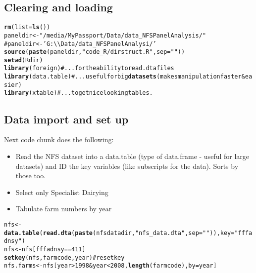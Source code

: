 \documentclass{article}\usepackage{graphicx, color}
\makeatletter
\newcommand{\hlfunctioncall}[1]{\textcolor[rgb]{0.501960784313725,0,0.329411764705882}{\textbf{#1}}}%
\newcommand{\hlstring}[1]{\textcolor[rgb]{0.6,0.6,1}{#1}}%
\newcommand{\hlcomment}[1]{\textcolor[rgb]{0.180392156862745,0.6,0.341176470588235}{#1}}%
\newenvironment{kframe}{%
 \def\at@end@of@kframe{}%
 \ifinner\ifhmode%
  \def\at@end@of@kframe{\end{minipage}}%
  \begin{minipage}{\columnwidth}%
 \fi\fi%
 \def\FrameCommand##1{\hskip\@totalleftmargin \hskip-\fboxsep
 \colorbox{shadecolor}{##1}\hskip-\fboxsep
     \hskip-\linewidth \hskip-\@totalleftmargin \hskip\columnwidth}%
 \MakeFramed {\advance\hsize-\width
   \@totalleftmargin\z@ \linewidth\hsize
   \@setminipage}}%
 {\par\unskip\endMakeFramed%
 \at@end@of@kframe}
\newenvironment{knitrout}{}{} %
\makeatother
\begin{document}
\begin{flushleft}
\subsection*{Clearing and loading}
\begin{knitrout}
\color{fgcolor}\begin{kframe}
\begin{alltt}
\hlfunctioncall{rm}(list = \hlfunctioncall{ls}())
paneldir <- \hlstring{"/media/MyPassport/Data/data_NFSPanelAnalysis/"}
\hlcomment{# paneldir <- 'G:\textbackslash{}\textbackslash{}Data/data_NFSPanelAnalysi/'}
\hlfunctioncall{source}(\hlfunctioncall{paste}(paneldir, \hlstring{"code_R/dirstruct.R"}, sep = \hlstring{""}))
\hlfunctioncall{setwd}(Rdir)
\hlfunctioncall{library}(foreign)  \hlcomment{#...for the ability to read .dta files}
\hlfunctioncall{library}(data.table)  \hlcomment{#... useful for big \hlfunctioncall{datasets} (makes manipulation faster & easier)}
\hlfunctioncall{library}(xtable)  \hlcomment{#... to get nice looking tables.}
\end{alltt}
\end{kframe}
\end{knitrout}

 
\subsection*{Data import and set up}

Next code chunk does the following:
\begin{itemize}
  \item {Read the NFS dataset into a data.table (type of data.frame - useful for large datasets) and ID the key
        variables (like subscripts for the data). Sorts by those too.}
  \item {Select only Specialist Dairying}
  \item {Tabulate farm numbers by year}
\end{itemize}
\begin{knitrout}
\color{fgcolor}\begin{kframe}
\begin{alltt}
nfs <- \hlfunctioncall{data.table}(\hlfunctioncall{read.dta}(\hlfunctioncall{paste}(nfsdatadir, \hlstring{"nfs_data.dta"}, sep = \hlstring{""})), key = \hlstring{"fffadnsy"})
nfs <- nfs[fffadnsy == 411]
\hlfunctioncall{setkey}(nfs, farmcode, year)  \hlcomment{# reset key}
nfs.farms <- nfs[year > 1998 & year < 2008, \hlfunctioncall{length}(farmcode), by = year]
\end{alltt}
\end{kframe}
\end{knitrout}



\end{flushleft}
\end{document}
